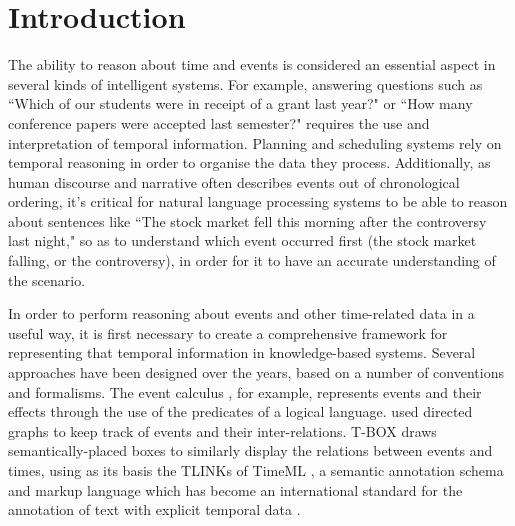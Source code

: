 \documentclass[a4paper,12pt,leqno,twoside]{article}
\begin{document}
\section{Introduction}\label{sec:intro}
The ability to reason about time and events is considered an essential aspect in several kinds of intelligent systems. For example, answering questions such as ``Which of our students were in receipt of a grant last year?" or ``How many conference papers were accepted last semester?" requires the use and interpretation of temporal information. Planning and scheduling systems rely on temporal reasoning in order to organise the data they process. Additionally, as human discourse and narrative often describes events out of chronological ordering, it's critical for natural language processing systems to be able to reason about sentences like ``The stock market fell this morning after the controversy last night," so as to understand which event occurred first (the stock market falling, or the controversy), in order for it to have an accurate understanding of the scenario.

In order to perform reasoning about events and other time-related data in a useful way, it is first necessary to create a comprehensive framework for representing that temporal information in knowledge-based systems. Several approaches have been designed over the years, based on a number of conventions and formalisms. The event calculus \citep{Kowalski1986,Miller1999,Mueller2008}, for example, represents events and their effects through the use of the predicates of a logical language. \citet{allen1983maintaining} used directed graphs to keep track of events and their inter-relations. T-BOX \citep{verhagen2005TBOX} draws semantically-placed boxes to similarly display the relations between events and times, using as its basis the TLINKs of TimeML \citep{timeml2005timeml}, a semantic annotation schema and markup language which has become an international standard \citep{ISO24617-1} for the annotation of text with explicit temporal data \citep{pustejovsky2010iso}.
\end{document}
